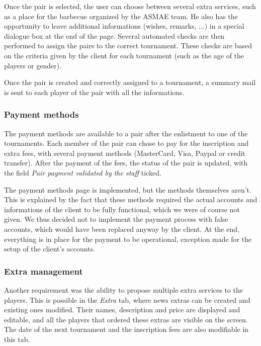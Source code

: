 Once the pair is selected, the user can choose between several extra services, such as a place for the barbecue organized by the ASMAE team. He also has the opportunity to leave additional informations (wishes, remarks, ...) in a special dialogue box at the end of the page. Several automated checks are then performed to assign the pairs to the correct tournament. These checks are based on the criteria given by the client for each tournament (such as the age of the players or gender). \newline

Once the pair is created and correctly assigned to a tournament, a summary mail is sent to each player of the pair with all the informations.


\subsubsection{Payment methods}
\label{subs:Payment methods}


The payment methods are available to a pair after the enlistment to one of the tournaments. Each member of the pair can chose to pay for the inscription and extra fees, with several payment methods (MasterCard, Visa, Paypal or credit transfer). After the payment of the fees, the status of the pair is updated, with the field \textit{Pair payment validated by the staff} ticked.\newline

The payment methods page is implemented, but the methods themselves aren't. This is explained by the fact that these methods required the actual accounts and informations of the client to be fully functional, which we were of course not given. We thus decided not to implement the payment process with false accounts, which would have been replaced anyway by the client. At the end, everything is in place for the payment to be operational, exception made for the setup of the client's accounts.

\subsubsection{Extra management}
\label{subs:Extra management}


Another requirement was the ability to propose multiple extra services to the players. This is possible in the \textit{Extra} tab, where news extras can be created and existing ones modified. Their names, description and price are displayed and editable, and all the players that ordered these extras are visible on the screen.
The date of the next tournament and the inscription fees are also modifiable in this tab.

